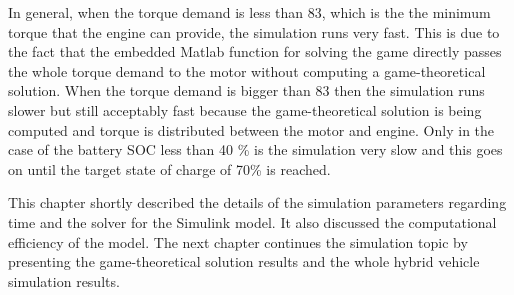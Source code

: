 In general, when the torque demand is less than 83, which is the the minimum torque that the engine can provide, the simulation runs very fast. This is due to the fact that the embedded Matlab function for solving the game directly passes the whole torque demand to the motor without computing a game-theoretical solution. When the torque demand is bigger than 83 then the simulation runs slower but still acceptably fast because the game-theoretical solution is being computed and torque is distributed between the motor and engine. Only in the case of the battery SOC less than 40 \% is the simulation very slow and this goes on until the target state of charge of 70\% is reached.

This chapter shortly described the details of the simulation parameters regarding time and the solver for the Simulink model. It also discussed the computational efficiency of the model. The next chapter continues the simulation topic by presenting the game-theoretical solution results and the whole hybrid vehicle simulation results.
